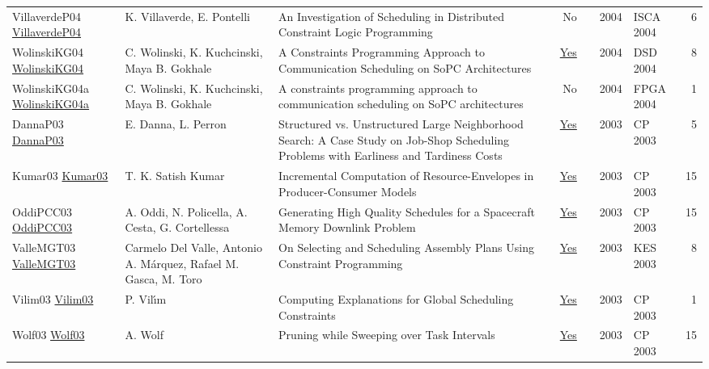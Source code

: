 {\begin{longtable}{p{3cm}p{6cm}p{7cm}rrrp{3cm}r}
VillaverdeP04 \href{}{VillaverdeP04} & K. Villaverde, E. Pontelli & An Investigation of Scheduling in Distributed Constraint Logic Programming & No & \cite{VillaverdeP04} & 2004 & ISCA 2004 & 6\\
WolinskiKG04 \href{https://doi.org/10.1109/DSD.2004.1333291}{WolinskiKG04} & C. Wolinski, K. Kuchcinski, Maya B. Gokhale & A Constraints Programming Approach to Communication Scheduling on SoPC Architectures & \href{papers/WolinskiKG04.pdf}{Yes} & \cite{WolinskiKG04} & 2004 & DSD 2004 & 8\\
WolinskiKG04a \href{https://doi.org/10.1145/968280.968336}{WolinskiKG04a} & C. Wolinski, K. Kuchcinski, Maya B. Gokhale & A constraints programming approach to communication scheduling on SoPC architectures & No & \cite{WolinskiKG04a} & 2004 & FPGA 2004 & 1\\
DannaP03 \href{https://doi.org/10.1007/978-3-540-45193-8\_59}{DannaP03} & E. Danna, L. Perron & Structured vs. Unstructured Large Neighborhood Search: {A} Case Study on Job-Shop Scheduling Problems with Earliness and Tardiness Costs & \href{papers/DannaP03.pdf}{Yes} & \cite{DannaP03} & 2003 & CP 2003 & 5\\
Kumar03 \href{https://doi.org/10.1007/978-3-540-45193-8\_45}{Kumar03} & T. K. Satish Kumar & Incremental Computation of Resource-Envelopes in Producer-Consumer Models & \href{papers/Kumar03.pdf}{Yes} & \cite{Kumar03} & 2003 & CP 2003 & 15\\
OddiPCC03 \href{https://doi.org/10.1007/978-3-540-45193-8\_39}{OddiPCC03} & A. Oddi, N. Policella, A. Cesta, G. Cortellessa & Generating High Quality Schedules for a Spacecraft Memory Downlink Problem & \href{papers/OddiPCC03.pdf}{Yes} & \cite{OddiPCC03} & 2003 & CP 2003 & 15\\
ValleMGT03 \href{https://doi.org/10.1007/978-3-540-45226-3\_180}{ValleMGT03} & Carmelo Del Valle, Antonio A. M{\'{a}}rquez, Rafael M. Gasca, M. Toro & On Selecting and Scheduling Assembly Plans Using Constraint Programming & \href{papers/ValleMGT03.pdf}{Yes} & \cite{ValleMGT03} & 2003 & KES 2003 & 8\\
Vilim03 \href{https://doi.org/10.1007/978-3-540-45193-8\_124}{Vilim03} & P. Vil{\'{\i}}m & Computing Explanations for Global Scheduling Constraints & \href{papers/Vilim03.pdf}{Yes} & \cite{Vilim03} & 2003 & CP 2003 & 1\\
Wolf03 \href{https://doi.org/10.1007/978-3-540-45193-8\_50}{Wolf03} & A. Wolf & Pruning while Sweeping over Task Intervals & \href{papers/Wolf03.pdf}{Yes} & \cite{Wolf03} & 2003 & CP 2003 & 15\\

\end{longtable}}
